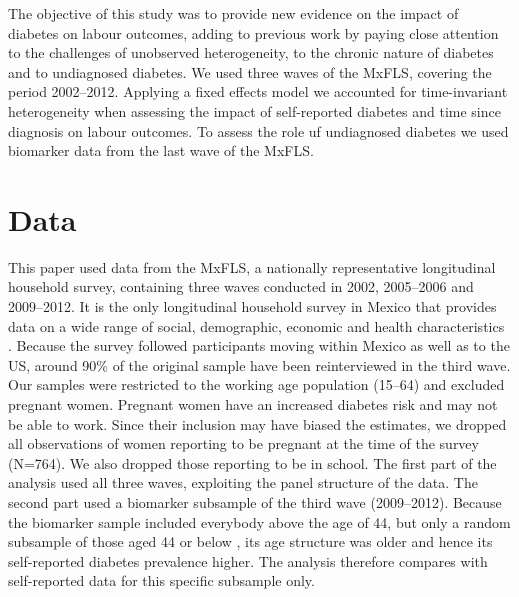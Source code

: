 \documentclass[12pt,english]{article}
\begin{document}
The objective of this study was to provide new evidence on the impact of diabetes on labour outcomes, adding to previous work by paying close attention to the challenges of unobserved heterogeneity, to the chronic nature of diabetes and to undiagnosed diabetes. We used three waves of the \ac{MxFLS}, covering the period 2002--2012. Applying a fixed effects model we accounted for time-invariant heterogeneity when assessing the impact of self-reported diabetes and time since diagnosis on labour outcomes. To assess the role uf undiagnosed diabetes we used biomarker data from the last wave of the \ac{MxFLS}.

\section{\label{sec:Data}Data}

This paper used data from the \acf{MxFLS}, a nationally representative longitudinal household survey, containing three waves conducted in 2002, 2005--2006 and 2009--2012. It is the only longitudinal household survey in Mexico that provides data on a wide range of social, demographic, economic and health characteristics \parencite{Rubalcava2013}. Because the survey followed participants moving within Mexico as well as to the US, around 90\% of the original sample have been reinterviewed in the third wave. Our samples were restricted to the working age population (15--64) and excluded pregnant women. Pregnant women have an increased diabetes risk and may not be able to work. Since their inclusion may have biased the estimates, we dropped all observations of women reporting to be pregnant at the time of the survey (N=764). We also dropped those reporting to be in school. The first part of the analysis used all three waves, exploiting the panel structure of the data. The second part used a biomarker subsample of the third wave (2009--2012). Because the biomarker sample included everybody above the age of 44, but only a random subsample of those aged 44 or below \parencite{Crimmins2015}, its age structure was older and hence its self-reported diabetes prevalence higher. The analysis therefore compares with self-reported data for this specific subsample only.
\end{document}
